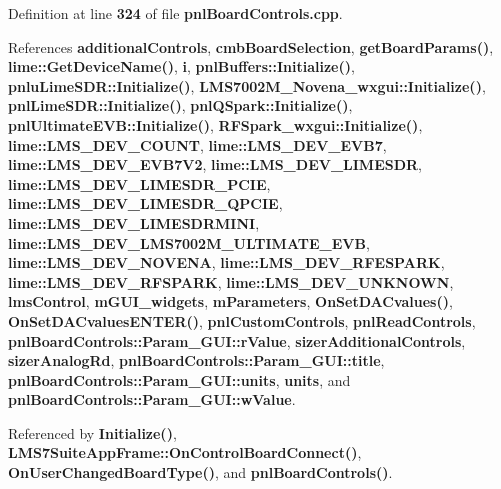 Definition at line {\bf 324} of file {\bf pnl\+Board\+Controls.\+cpp}.



References {\bf additional\+Controls}, {\bf cmb\+Board\+Selection}, {\bf get\+Board\+Params()}, {\bf lime\+::\+Get\+Device\+Name()}, {\bf i}, {\bf pnl\+Buffers\+::\+Initialize()}, {\bf pnlu\+Lime\+S\+D\+R\+::\+Initialize()}, {\bf L\+M\+S7002\+M\+\_\+\+Novena\+\_\+wxgui\+::\+Initialize()}, {\bf pnl\+Lime\+S\+D\+R\+::\+Initialize()}, {\bf pnl\+Q\+Spark\+::\+Initialize()}, {\bf pnl\+Ultimate\+E\+V\+B\+::\+Initialize()}, {\bf R\+F\+Spark\+\_\+wxgui\+::\+Initialize()}, {\bf lime\+::\+L\+M\+S\+\_\+\+D\+E\+V\+\_\+\+C\+O\+U\+NT}, {\bf lime\+::\+L\+M\+S\+\_\+\+D\+E\+V\+\_\+\+E\+V\+B7}, {\bf lime\+::\+L\+M\+S\+\_\+\+D\+E\+V\+\_\+\+E\+V\+B7\+V2}, {\bf lime\+::\+L\+M\+S\+\_\+\+D\+E\+V\+\_\+\+L\+I\+M\+E\+S\+DR}, {\bf lime\+::\+L\+M\+S\+\_\+\+D\+E\+V\+\_\+\+L\+I\+M\+E\+S\+D\+R\+\_\+\+P\+C\+IE}, {\bf lime\+::\+L\+M\+S\+\_\+\+D\+E\+V\+\_\+\+L\+I\+M\+E\+S\+D\+R\+\_\+\+Q\+P\+C\+IE}, {\bf lime\+::\+L\+M\+S\+\_\+\+D\+E\+V\+\_\+\+L\+I\+M\+E\+S\+D\+R\+M\+I\+NI}, {\bf lime\+::\+L\+M\+S\+\_\+\+D\+E\+V\+\_\+\+L\+M\+S7002\+M\+\_\+\+U\+L\+T\+I\+M\+A\+T\+E\+\_\+\+E\+VB}, {\bf lime\+::\+L\+M\+S\+\_\+\+D\+E\+V\+\_\+\+N\+O\+V\+E\+NA}, {\bf lime\+::\+L\+M\+S\+\_\+\+D\+E\+V\+\_\+\+R\+F\+E\+S\+P\+A\+RK}, {\bf lime\+::\+L\+M\+S\+\_\+\+D\+E\+V\+\_\+\+R\+F\+S\+P\+A\+RK}, {\bf lime\+::\+L\+M\+S\+\_\+\+D\+E\+V\+\_\+\+U\+N\+K\+N\+O\+WN}, {\bf lms\+Control}, {\bf m\+G\+U\+I\+\_\+widgets}, {\bf m\+Parameters}, {\bf On\+Set\+D\+A\+Cvalues()}, {\bf On\+Set\+D\+A\+Cvalues\+E\+N\+T\+E\+R()}, {\bf pnl\+Custom\+Controls}, {\bf pnl\+Read\+Controls}, {\bf pnl\+Board\+Controls\+::\+Param\+\_\+\+G\+U\+I\+::r\+Value}, {\bf sizer\+Additional\+Controls}, {\bf sizer\+Analog\+Rd}, {\bf pnl\+Board\+Controls\+::\+Param\+\_\+\+G\+U\+I\+::title}, {\bf pnl\+Board\+Controls\+::\+Param\+\_\+\+G\+U\+I\+::units}, {\bf units}, and {\bf pnl\+Board\+Controls\+::\+Param\+\_\+\+G\+U\+I\+::w\+Value}.



Referenced by {\bf Initialize()}, {\bf L\+M\+S7\+Suite\+App\+Frame\+::\+On\+Control\+Board\+Connect()}, {\bf On\+User\+Changed\+Board\+Type()}, and {\bf pnl\+Board\+Controls()}.



